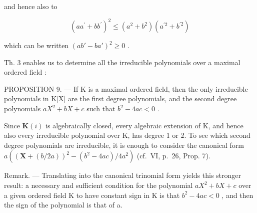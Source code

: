 and hence also to

\[
(a a ^ {\prime} + b b ^ {\prime}) ^ {2} \leqslant (a ^ {2} + b ^ {2}) (a ^ {\prime 2} + b ^ {\prime 2})
\]

which can be written \((ab' - ba')^2 \geqslant 0\) .

Th. 3 enables us to determine all the irreducible polynomials over a maximal ordered field :

PROPOSITION 9. --- If K is a maximal ordered field, then the only irreducible polynomials in K{[}X{]} are the first degree polynomials, and the second degree polynomials \(aX^{2} + bX + c\) such that \(b^{2} - 4ac < 0\) .

Since \(\mathbf{K}(i)\) is algebraically closed, every algebraic extension of K, and hence also every irreducible polynomial over K, has degree 1 or 2. To see which second degree polynomials are irreducible, it is enough to consider the canonical form \(a((\mathbf{X} + (b/2a))^2 - (b^2 - 4ac)/4a^2)\) (cf.~VI, p.~26, Prop. 7).

Remark. --- Translating into the canonical trinomial form yields this stronger result: a necessary and sufficient condition for the polynomial \(aX^{2} + bX + c\) over a given ordered field K to have constant sign in K is that \(b^{2} - 4ac < 0\) , and then the sign of the polynomial is that of a.

